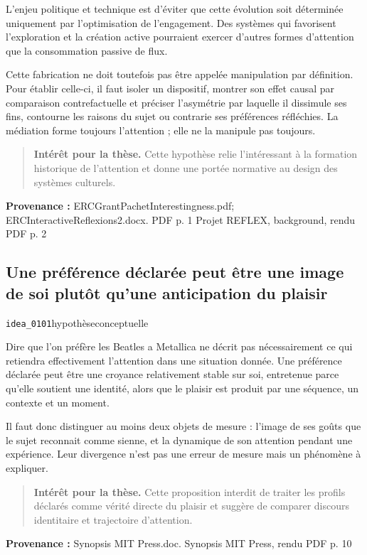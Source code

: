 \documentclass[10pt,a4paper]{article}
\begin{document}
L'enjeu politique et technique est d'éviter que cette évolution soit déterminée uniquement par l'optimisation de l'engagement. Des systèmes qui favorisent l'exploration et la création active pourraient exercer d'autres formes d'attention que la consommation passive de flux.

Cette fabrication ne doit toutefois pas être appelée manipulation par définition. Pour établir celle-ci, il faut isoler un dispositif, montrer son effet causal par comparaison contrefactuelle et préciser l'asymétrie par laquelle il dissimule ses fins, contourne les raisons du sujet ou contrarie ses préférences réfléchies. La médiation forme toujours l'attention ; elle ne la manipule pas toujours.

\begin{quote}
\textbf{Intérêt pour la thèse.} Cette hypothèse relie l'intéressant à la formation historique de l'attention et donne une portée normative au design des systèmes culturels.
\end{quote}
{\footnotesize\color{metadata}\textbf{Provenance :} ERCGrantPachetInterestingness.pdf; ERCInteractiveReflexions2.docx. PDF p. 1 Projet REFLEX, background, rendu PDF p. 2\par}

\subsection{Une préférence déclarée peut être une image de soi plutôt qu'une anticipation du plaisir}
{\small\color{metadata} \texttt{idea\_0101}\quad\textbullet\quad hypothèse\quad\textbullet\quad conceptuelle\par}

Dire que l'on préfère les Beatles a Metallica ne décrit pas nécessairement ce qui retiendra effectivement l'attention dans une situation donnée. Une préférence déclarée peut être une croyance relativement stable sur soi, entretenue parce qu'elle soutient une identité, alors que le plaisir est produit par une séquence, un contexte et un moment.

Il faut donc distinguer au moins deux objets de mesure : l'image de ses goûts que le sujet reconnait comme sienne, et la dynamique de son attention pendant une expérience. Leur divergence n'est pas une erreur de mesure mais un phénomène à expliquer.

\begin{quote}
\textbf{Intérêt pour la thèse.} Cette proposition interdit de traiter les profils déclarés comme vérité directe du plaisir et suggère de comparer discours identitaire et trajectoire d'attention.
\end{quote}
{\footnotesize\color{metadata}\textbf{Provenance :} Synopsis MIT Press.doc. Synopsis MIT Press, rendu PDF p. 10\par}
\end{document}
